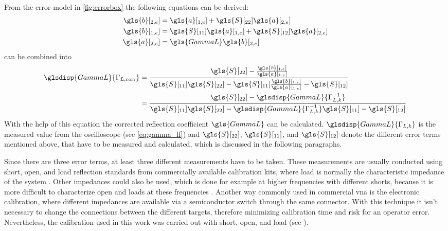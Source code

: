 \documentclass[12pt,a4paper,parskip=full,abstract=true,BCOR=12mm]{scrreprt}
\begin{document}
From the error model in \cref{fig:errorbox} the following equations can be derived:
\begin{align}
    \label{eq:b2} \gls{b}[_{2,e}] & = \gls{a}[_{1,e}] + \gls{S}[_{22}] \gls{a}[_{2,e}]\\
    \label{eq:b1} \gls{b}[_{1,e}] & = \gls{S}[_{11}] \gls{a}[_{1,e}] + \gls{S}[_{12}] \gls{a}[_{2,e}] \\
    \label{eq:a2} \gls{a}[_{2,e}] & = \gls{GammaL} \gls{b}[_{2,e}]
\end{align}
 can be combined into
\begin{equation}\label{eq:gamma_err}
    \begin{split}
        \glsdisp{GammaL}{\Gamma_{L,\text{corr}}} & = \frac{\gls{S}[_{22}] - \frac{\gls{b}[_{1,e}]}{\gls{a}[_{1,e}]}}{\gls{S}[_{11}] \gls{S}[_{22}] - \gls{S}[_{11}]\frac{\gls{b}[_{1,e}]}{\gls{a}[_{1,e}]} - \gls{S}[_{12}]} \\
        & = \frac{\gls{S}[_{22}] - \glsdisp{GammaL}{\Gamma_{L,k}^{-1}}}{\gls{S}[_{11}] \gls{S}[_{22}] - \glsdisp{GammaL}{\Gamma_{L,k}^{-1}}\gls{S}[_{11}] - \gls{S}[_{12}]}
    \end{split}
\end{equation}
With the help of this equation the corrected reflection coefficient $\gls{GammaL}$ can be calculated.
$\glsdisp{GammaL}{\Gamma_{L,k}}$ is the measured value from the oscilloscope (see \cref{eq:gamma_lf}) and $\gls{S}[_{22}]$, $\gls{S}[_{11}]$, and $\gls{S}[_{12}]$ denote the different
error terms mentioned above, that have to be measured and calculated, which is discussed in the following paragraphs.

Since there are three error terms, at least three different measurements have
to be taken. These measurements are usually conducted using short, open, and load reflection standards from commercially available calibration kits,
where load is normally the characteristic impedance of the system \cite{agilent_an_1287-3}.
Other impedances could also be used, which is done for example at higher frequencies
with different shorts, because it is more difficult to characterize open and
loads at these frequencies \cite{anritsu_cal}. Another way commonly used in
commercial \gls{vna} is the electronic calibration, where different impedances
are available via a semiconductor switch through the same connector. With this
technique it isn't necessary to change the connections between the different
targets, therefore minimizing calibration time and risk for an operator error.
Nevertheless, the calibration used in this work was carried out with short, open, and load (see
).
\end{document}
